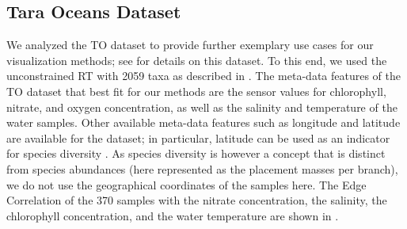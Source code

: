 
\subsection{Tara Oceans Dataset}
\label{ch:Visualization:sec:Results:sub:TaraDataset}

We analyzed the \acf{TO} dataset \cite{Karsenti2011,Sunagawa2015,Guidi2016}
to provide further exemplary use cases for our visualization methods;
see  for details on this dataset.
To this end, we used the unconstrained  \ac{RT} with \num{2059} taxa
as described in .
The meta-data features of the \ac{TO} dataset that best fit for our methods are the sensor values for
chlorophyll, nitrate, and oxygen concentration, as well as the salinity and temperature of the water samples.
Other available meta-data features such as longitude and latitude are available for the dataset;
in particular, latitude can be used as an indicator for species diversity \cite{Sunagawa2015}.
As species diversity is however a concept that is distinct from species abundances
(here represented as the placement masses per branch),
we do not use the geographical coordinates of the samples here.
The Edge Correlation of the \num{370} samples with the nitrate concentration, the salinity, the chlorophyll concentration,
and the water temperature are shown in .


